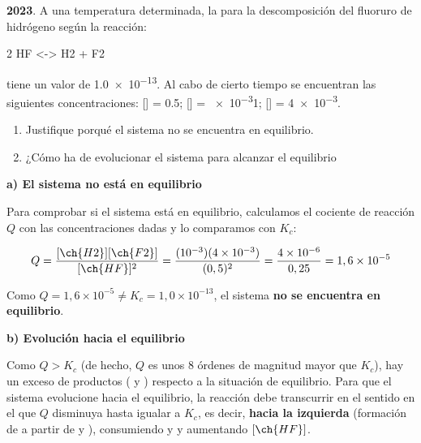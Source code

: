 \begin{exerciseEVAU}
    \textbf{2023}. A una temperatura determinada, la \Kc{} para la descomposición del fluoruro de hidrógeno según la reacción:
    \begin{reaction*}
        2 HF \gas{} <-> H2 \gas{} + F2 \gas{}
    \end{reaction*}
    tiene un valor de \num{1.0e-13}.
    Al cabo de cierto tiempo se encuentran las siguientes concentraciones: [] = \qty{0.5}{\M}; [] = \qty{e-3}{\M}1; [] = \qty{4e-3}{\M}.
    \begin{enumerate}[label=\letraminuscula]
        \item Justifique porqué el sistema no se encuentra en equilibrio.
        \item ¿Cómo ha de evolucionar el sistema para alcanzar el equilibrio
    \end{enumerate}

    \begin{solu}

        \textbf{a) El sistema no está en equilibrio}

        Para comprobar si el sistema está en equilibrio, calculamos el cociente de reacción \(Q\) con las concentraciones dadas y lo comparamos con \(K_c\):

        \begin{equation*}
            Q = \dfrac{[\ch{H2}][\ch{F2}]}{[\ch{HF}]^2} = \dfrac{(10^{-3})(4 \times 10^{-3})}{(0,5)^2} = \dfrac{4 \times 10^{-6}}{0,25} = 1,6 \times 10^{-5}
        \end{equation*}

        Como \(Q = 1,6 \times 10^{-5} \neq K_c = 1,0 \times 10^{-13}\), el sistema \textbf{no se encuentra en equilibrio}.

        \textbf{b) Evolución hacia el equilibrio}

        Como \(Q > K_c\) (de hecho, \(Q\) es unos 8 órdenes de magnitud mayor que \(K_c\)), hay un exceso de productos ( y ) respecto a la situación de equilibrio. Para que el sistema evolucione hacia el equilibrio, la reacción debe transcurrir en el sentido en el que \(Q\) disminuya hasta igualar a \(K_c\), es decir, \textbf{hacia la izquierda} (formación de  a partir de  y ), consumiendo  y  y aumentando \([\ch{HF}]\).

    \end{solu}
\end{exerciseEVAU}

